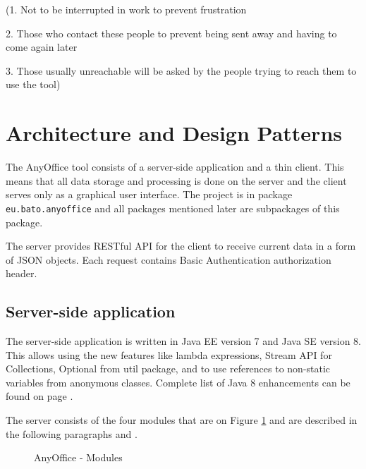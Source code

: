 \documentclass[11pt,singleside]{myfithesis2}
\newcommand{\pict}[4]{
	\begin{figure}[h!]
  		\vspace{-7px}
  		\centerline{\fcolorbox{darkgray}{palegray}{\texttt{[image: \#2]}}}
  		\caption{#1}
  		\label{#4}
	\end{figure}
}
\begin{document}
(1. Not to be interrupted in work to prevent frustration

2. Those who contact these people to prevent being sent away and having to come again later

3. Those usually unreachable will be asked by the people trying to reach them to use the tool)

	
	\section{Architecture and Design Patterns}
The AnyOffice tool consists of a server-side application and a thin client. This means that all data storage and processing is done on the server and the client serves only as a graphical user interface. The project is in package \texttt{eu.bato.anyoffice} and all packages mentioned later are subpackages of this package.

The server provides RESTful API for the client to receive current data in a form of JSON objects. Each request contains Basic Authentication authorization header.


		\subsection{Server-side application}
The server-side application is written in Java EE version 7 and Java SE version 8. This allows using the new features like lambda expressions, Stream API for Collections, Optional from util package, and to use references to non-static variables from anonymous classes. Complete list of Java 8 enhancements can be found on page \cite{java8}.

The server consists of the four modules that are on Figure \ref{pic:anyofficeModules} and are described in the following paragraphs and .

\pict{AnyOffice - Modules}{data/modules.png}{width=0.8\textwidth}{pic:anyofficeModules}
\end{document}
